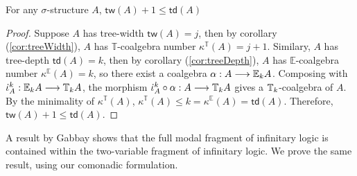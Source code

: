 \begin{prop}
For any $\sigma$-structure $A$, $\mathsf{tw}(A) + 1 \leq \mathsf{td}(A)$
\begin{proof}
Suppose $A$ has tree-width $\mathsf{tw}(A) = j$, then by corollary (\ref{cor:treeWidth}), $A$ has $\mathbb{T}$-coalgebra number $\kappa^{\mathbb{T}}(A) = j+1$. Similary, $A$ has tree-depth $\mathsf{td}(A) = k$, then by corollary (\ref{cor:treeDepth}), $A$ has $\mathbb{E}$-coalgebra number $\kappa^{\mathbb{E}}(A) = k$, so there exist a coalgebra $\alpha:A \longrightarrow {\mathbb{E}_{k}A}$. Composing with $\iota^{k}_{A}:\efcomonad{k}{A} \longrightarrow \pcomonad{k}{A}$, the morphism $\iota^{k}_{A} \circ \alpha:A \longrightarrow \pcomonad{k}{A}$ gives a ${\mathbb{T}_{k}}$-coalgebra of $A$. By the minimality of $\kappa^{\mathbb{T}}(A)$, $\kappa^{\mathbb{T}}(A) \leq k = \kappa^{\mathbb{E}}(A) = \mathsf{td}(A)$. Therefore, $\mathsf{tw}(A) + 1 \leq \mathsf{td}(A)$.  
\end{proof}
\end{prop}
A result by Gabbay \cite{Gabbay1981} shows that the full modal fragment of infinitary logic is contained within the two-variable fragment of infinitary logic. We prove the same result, using our comonadic formulation.
